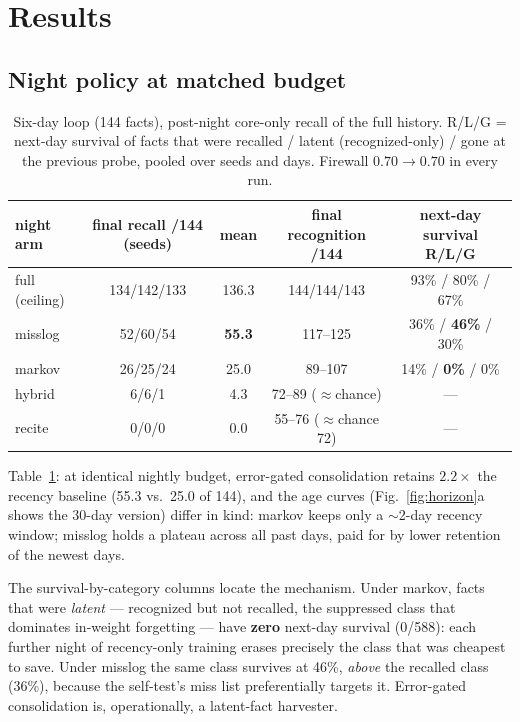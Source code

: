 \documentclass[11pt]{article}
\begin{document}
\section{Results}

\subsection{Night policy at matched budget}\label{sec:policies}

\begin{table}[t]\centering\small
\begin{tabular}{lcccc}
\toprule
night arm & final recall /144 (seeds) & mean & final recognition /144 & next-day survival R/L/G \\
\midrule
full (ceiling) & 134/142/133 & 136.3 & 144/144/143 & 93\% / 80\% / 67\% \\
misslog        & 52/60/54    & \textbf{55.3} & 117--125 & 36\% / \textbf{46\%} / 30\% \\
markov         & 26/25/24    & 25.0  & 89--107  & 14\% / \textbf{0\%} / 0\% \\
hybrid         & 6/6/1       & 4.3   & 72--89 ($\approx$chance) & --- \\
recite         & 0/0/0       & 0.0   & 55--76 ($\approx$chance 72) & --- \\
\bottomrule
\end{tabular}
\caption{Six-day loop (144 facts), post-night core-only recall of the full history. R/L/G =
next-day survival of facts that were recalled / latent (recognized-only) / gone at the previous
probe, pooled over seeds and days. Firewall $0.70\to0.70$ in every run.}
\label{tab:d6}
\end{table}

Table~\ref{tab:d6}: at identical nightly budget, error-gated consolidation retains $2.2\times$ the
recency baseline (55.3 vs.\ 25.0 of 144), and the age curves (Fig.~\ref{fig:horizon}a shows the
30-day version) differ in kind: markov keeps only a $\sim$2-day recency window; misslog holds a
plateau across all past days, paid for by lower retention of the newest days.

The survival-by-category columns locate the mechanism. Under markov, facts that were \emph{latent}
--- recognized but not recalled, the suppressed class that dominates in-weight forgetting
\citep{lin2026persistence} --- have \textbf{zero} next-day survival (0/588): each further night of
recency-only training erases precisely the class that was cheapest to save. Under misslog the same
class survives at 46\%, \emph{above} the recalled class (36\%), because the self-test's miss list
preferentially targets it. Error-gated consolidation is, operationally, a latent-fact harvester.
\end{document}
